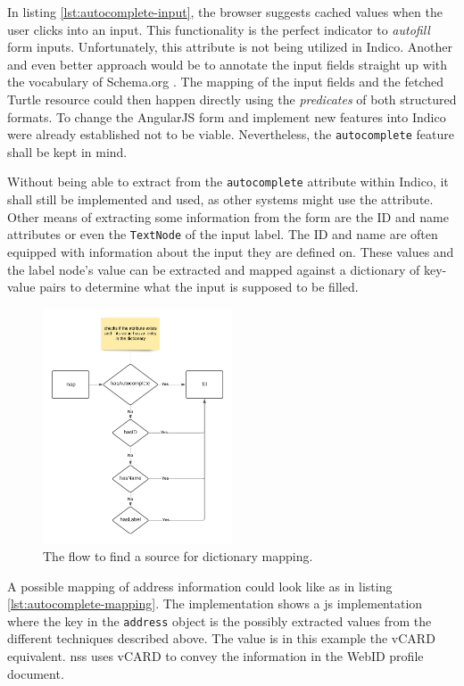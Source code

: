 In listing \ref{lst:autocomplete-input}, the browser suggests cached values when the user clicks into an input. This functionality is the perfect indicator to \textit{autofill} form inputs. Unfortunately, this attribute is not being utilized in Indico. Another and even better approach would be to annotate the input fields straight up with the vocabulary of Schema.org \cite{schema-org}. The mapping of the input fields and the fetched Turtle resource could then happen directly using the \textit{predicates} of both structured formats. To change the AngularJS form and implement new features into Indico were already established not to be viable. Nevertheless, the \texttt{autocomplete} feature shall be kept in mind.

Without being able to extract from the \texttt{autocomplete} attribute within Indico, it shall still be implemented and used, as other systems might use the attribute. Other means of extracting some information from the form are the ID and name attributes or even the \texttt{TextNode} of the input label. The ID and name are often equipped with information about the input they are defined on. These values and the label node's value can be extracted and mapped against a dictionary of key-value pairs to determine what the input is supposed to be filled.

\begin{figure}[H]
    \centering
    \includegraphics[width=0.5\textwidth]{prototype/graphs/poc-autocomplete-mapping-flow.png}
    \caption{The flow to find a source for dictionary mapping.}
    \label{fig:poc-autocomplete-mapping-flow}
\end{figure}

A possible mapping of address information could look like as in listing \ref{lst:autocomplete-mapping}. The implementation shows a \gls{js} implementation where the key in the \texttt{address} object is the possibly extracted values from the different techniques described above. The value is in this example the vCARD \cite{vcard-spec} equivalent. \gls{nss} uses vCARD to convey the information in the WebID profile document.

